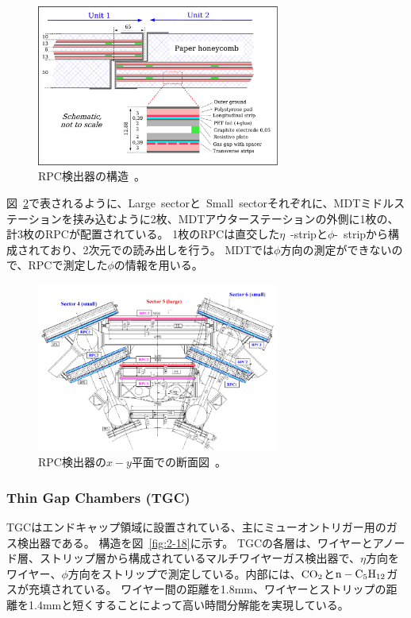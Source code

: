 \begin{figure}[h]
  \centering
  \includegraphics[clip, width=8cm]{fig/2/RPC_structure.pdf}
  \caption{RPC検出器の構造~\cite{Aad:1129811}。}
  \label{fig:2-16}
\end{figure}

図~\ref{fig:2-17}で表されるように、Large~sectorと~Small~sectorそれぞれに、MDTミドルステーションを挟み込むように2枚、MDTアウターステーションの外側に1枚の、計3枚のRPCが配置されている。
1枚のRPCは直交した$\eta$~-stripと$\phi$-~stripから構成されており、2次元での読み出しを行う。
MDTでは$\phi$方向の測定ができないので、RPCで測定した$\phi$の情報を用いる。

\begin{figure}[h]
  \centering
  \includegraphics[clip, width=8cm]{fig/2/RPC_xy.pdf}
  \caption{RPC検出器の$x-y$平面での断面図~\cite{Aad:1129811}。}
  \label{fig:2-17}
\end{figure}

\subsubsection{Thin Gap Chambers (TGC)}
TGCはエンドキャップ領域に設置されている、主にミューオントリガー用のガス検出器である。
構造を図~\ref{fig:2-18}に示す。
TGCの各層は、ワイヤーとアノード層、ストリップ層から構成されているマルチワイヤーガス検出器で、$\eta$方向をワイヤー、$\phi$方向をストリップで測定している。内部には、$\rm{CO_{2}}$と$\rm{n - C_{5}H_{12}}$ガスが充填されている。
ワイヤー間の距離を1.8mm、ワイヤーとストリップの距離を1.4mmと短くすることによって高い時間分解能を実現している。

